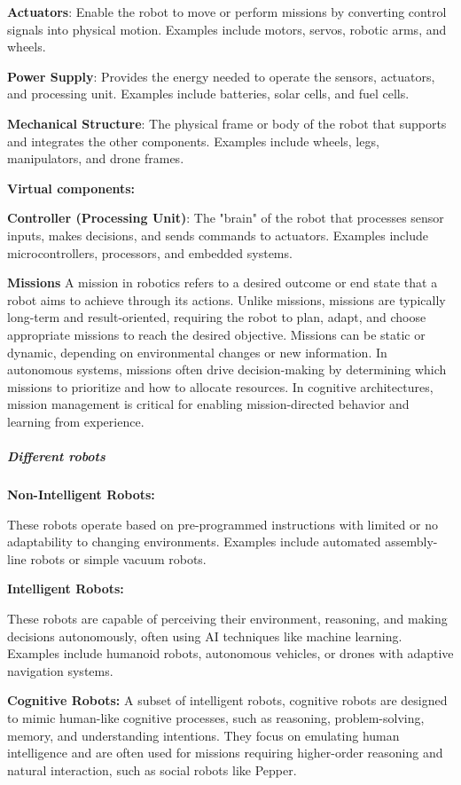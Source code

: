 \documentclass{book}
\providecommand{\ProjectDeepHeading}[2]{%
    \par\medskip\noindent\textbf{#2}\par\smallskip
}
\begin{document}
        \textbf{Actuators}: Enable the robot to move or perform missions by converting control signals into physical motion.
        Examples include motors, servos, robotic arms, and wheels.

        \textbf{Power Supply}: Provides the energy needed to operate the sensors, actuators, and processing unit.
        Examples include batteries, solar cells, and fuel cells.

        \textbf{Mechanical Structure}: The physical frame or body of the robot that supports and integrates the other components.
        Examples include wheels, legs, manipulators, and drone frames.

    \ProjectDeepHeading{1}{Virtual components:}
        \textbf{Controller (Processing Unit)}: The "brain" of the robot that processes sensor inputs, makes decisions, and sends commands to actuators.
        Examples include microcontrollers, processors, and embedded systems.

        \textbf{Missions} A mission in robotics refers to a desired outcome or end state that a robot aims to achieve through its actions. Unlike missions, missions are typically long-term and result-oriented, requiring the robot to plan, adapt, and choose appropriate missions to reach the desired objective. Missions can be static or dynamic, depending on environmental changes or new information. In autonomous systems, missions often drive decision-making by determining which missions to prioritize and how to allocate resources. In cognitive architectures, mission management is critical for enabling mission-directed behavior and learning from experience.
        




\subparagraph{Different robots}

    \ProjectDeepHeading{1}{Non-Intelligent Robots:} These robots operate based on pre-programmed instructions with limited or no adaptability to changing environments. Examples include automated assembly-line robots or simple vacuum robots. 

    \ProjectDeepHeading{1}{Intelligent Robots:} These robots are capable of perceiving their environment, reasoning, and making decisions autonomously, often using AI techniques like machine learning. Examples include humanoid robots, autonomous vehicles, or drones with adaptive navigation systems. 

        \textbf{Cognitive Robots:} A subset of intelligent robots, cognitive robots are designed to mimic human-like cognitive processes, such as reasoning, problem-solving, memory, and understanding intentions. They focus on emulating human intelligence and are often used for missions requiring higher-order reasoning and natural interaction, such as social robots like Pepper.
\end{document}
